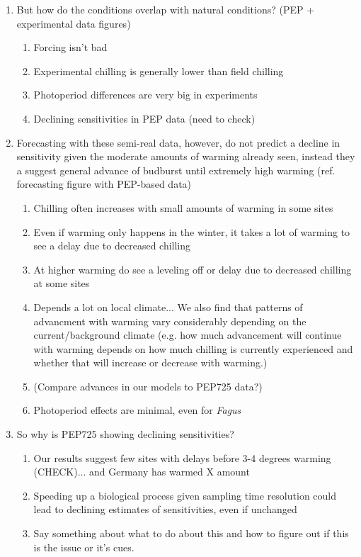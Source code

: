 \documentclass[11pt,letter]{article}
\begin{document}
\begin{enumerate}
\item But how do the conditions overlap with natural conditions? (PEP + experimental data figures)
\begin{enumerate}
\item Forcing isn't bad
\item Experimental chilling is generally lower than field chilling
\item Photoperiod differences are very big in experiments
\item Declining sensitivities in PEP data (need to check)
\end{enumerate}
\item Forecasting with these semi-real data, however, do not predict a decline in sensitivity given the moderate amounts of warming already seen, instead they a suggest general advance of budburst until extremely high warming (ref. forecasting figure with PEP-based data)
\begin{enumerate}
\item Chilling often increases with small amounts of warming in some sites
\item Even if warming only happens in the winter, it takes a lot of warming to see a delay due to decreased chilling
\item At higher warming do see a leveling off or delay due to decreased chilling at some sites
\item Depends a lot on local climate... We also find that patterns of advancment with warming vary considerably depending on the current/background climate (e.g. how much advancement will continue with warming depends on how much chilling is currently experienced and whether that will increase or decrease with warming.)
\item (Compare advances in our models to PEP725 data?)
\item Photoperiod effects are minimal, even for \emph{Fagus}
\end{enumerate}
\item So why is PEP725 showing declining sensitivities?
\begin{enumerate}
\item Our results suggest few sites with delays before 3-4 degrees warming (CHECK)... and Germany has warmed X amount
\item Speeding up a biological process given sampling time resolution could lead to declining estimates of sensitivities, even if unchanged
\item Say something about what to do about this and how to figure out if this is the issue or it's cues. 

\end{enumerate}
\end{enumerate}
\end{document}

